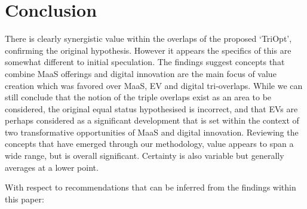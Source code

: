 \documentclass[journal]{IEEEtran}
\begin{document}


 



\section{Conclusion}\label{conclusion}

There is clearly synergistic value within the overlaps of the proposed
`TriOpt', confirming the original hypothesis. However it appears the
specifics of this are somewhat different to initial speculation. The
findings suggest concepts that combine MaaS offerings and digital
innovation are the main focus of value creation which was favored over
MaaS, EV and digital tri-overlaps. While we can still conclude that
the notion of the triple overlaps exist as an area to be considered,
the original equal status hypothesised is incorrect, and that EVs are
perhaps considered as a significant development that is set within the
context of two transformative opportunities of MaaS and digital
innovation. Reviewing the concepts that have emerged through our
methodology, value appears to span a wide range, but is overall
significant. Certainty is also variable but generally averages at a
lower point.

With respect to recommendations that can be inferred from the findings
within this paper:
\end{document}
